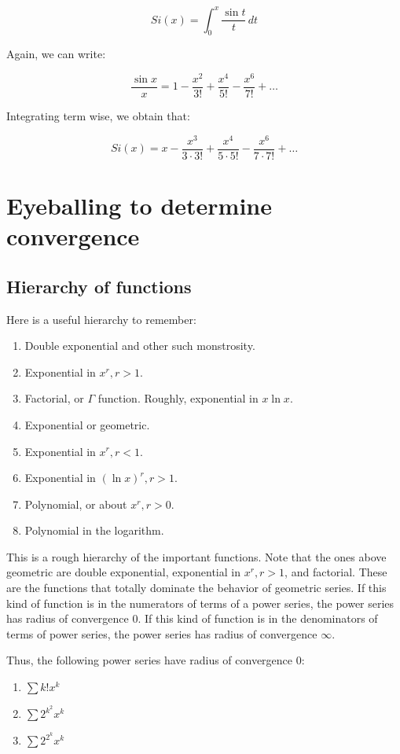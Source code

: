 \documentclass{amsart}
\begin{document}
$$Si(x) = \int_0^x \frac{\sin t}{t} \, dt$$

Again, we can write:

$$\frac{\sin x}{x} = 1 - \frac{x^2}{3!} + \frac{x^4}{5!} - \frac{x^6}{7!} + \dots$$

Integrating term wise, we obtain that:

$$Si(x) = x - \frac{x^3}{3 \cdot 3!} + \frac{x^4}{5 \cdot 5!} - \frac{x^6}{7 \cdot 7!} + \dots$$

\section{Eyeballing to determine convergence}

\subsection{Hierarchy of functions}

Here is a useful hierarchy to remember:

\begin{enumerate}
\item Double exponential and other such monstrosity.
\item Exponential in $x^r, r > 1$.
\item Factorial, or $\Gamma$ function. Roughly, exponential in $x \ln
  x$.
\item Exponential or geometric.
\item Exponential in $x^r, r < 1$.
\item Exponential in $(\ln x)^r, r > 1$.
\item Polynomial, or about $x^r, r > 0$.
\item Polynomial in the logarithm.
\end{enumerate}

This is a rough hierarchy of the important functions. Note that the
ones above geometric are double exponential, exponential in $x^r, r >
1$, and factorial. These are the functions that totally dominate the
behavior of geometric series. If this kind of function is in the
numerators of terms of a power series, the power series has radius of
convergence $0$. If this kind of function is in the denominators of
terms of power series, the power series has radius of convergence
$\infty$.

Thus, the following power series have radius of convergence $0$:

\begin{enumerate}
\item $\sum k!x^k$
\item $\sum 2^{k^2}x^k$
\item $\sum 2^{2^k} x^k$
\end{enumerate}
\end{document}
